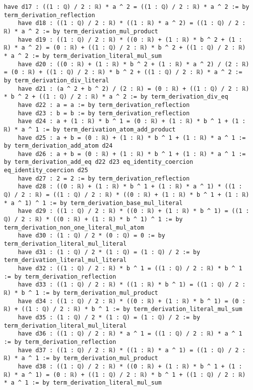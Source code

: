 \documentclass{article}
\begin{document}
\begin{tcolorbox}[colback=white!10, width=\linewidth]
\begin{lstlisting}[language=Lean4]
    have d17 : ((1 : ℚ) / 2 : ℝ) * a ^ 2 = ((1 : ℚ) / 2 : ℝ) * a ^ 2 := by term_derivation_reflection
    have d18 : ((1 : ℚ) / 2 : ℝ) * ((1 : ℝ) * a ^ 2) = ((1 : ℚ) / 2 : ℝ) * a ^ 2 := by term_derivation_mul_product
    have d19 : ((1 : ℚ) / 2 : ℝ) * ((0 : ℝ) + (1 : ℝ) * b ^ 2 + (1 : ℝ) * a ^ 2) = (0 : ℝ) + ((1 : ℚ) / 2 : ℝ) * b ^ 2 + ((1 : ℚ) / 2 : ℝ) * a ^ 2 := by term_derivation_literal_mul_sum
    have d20 : ((0 : ℝ) + (1 : ℝ) * b ^ 2 + (1 : ℝ) * a ^ 2) / (2 : ℝ) = (0 : ℝ) + ((1 : ℚ) / 2 : ℝ) * b ^ 2 + ((1 : ℚ) / 2 : ℝ) * a ^ 2 := by term_derivation_div_literal
    have d21 : (a ^ 2 + b ^ 2) / (2 : ℝ) = (0 : ℝ) + ((1 : ℚ) / 2 : ℝ) * b ^ 2 + ((1 : ℚ) / 2 : ℝ) * a ^ 2 := by term_derivation_div_eq
    have d22 : a = a := by term_derivation_reflection
    have d23 : b = b := by term_derivation_reflection
    have d24 : a + (1 : ℝ) * b ^ 1 = (0 : ℝ) + (1 : ℝ) * b ^ 1 + (1 : ℝ) * a ^ 1 := by term_derivation_atom_add_product
    have d25 : a + b = (0 : ℝ) + (1 : ℝ) * b ^ 1 + (1 : ℝ) * a ^ 1 := by term_derivation_add_atom d24
    have d26 : a + b = (0 : ℝ) + (1 : ℝ) * b ^ 1 + (1 : ℝ) * a ^ 1 := by term_derivation_add_eq d22 d23 eq_identity_coercion eq_identity_coercion d25
    have d27 : 2 = 2 := by term_derivation_reflection
    have d28 : ((0 : ℝ) + (1 : ℝ) * b ^ 1 + (1 : ℝ) * a ^ 1) * ((1 : ℚ) / 2 : ℝ) = ((1 : ℚ) / 2 : ℝ) * ((0 : ℝ) + (1 : ℝ) * b ^ 1 + (1 : ℝ) * a ^ 1) ^ 1 := by term_derivation_base_mul_literal
    have d29 : ((1 : ℚ) / 2 : ℝ) * ((0 : ℝ) + (1 : ℝ) * b ^ 1) = ((1 : ℚ) / 2 : ℝ) * ((0 : ℝ) + (1 : ℝ) * b ^ 1) ^ 1 := by term_derivation_non_one_literal_mul_atom
    have d30 : (1 : ℚ) / 2 * (0 : ℚ) = 0 := by term_derivation_literal_mul_literal
    have d31 : (1 : ℚ) / 2 * (1 : ℚ) = (1 : ℚ) / 2 := by term_derivation_literal_mul_literal
    have d32 : ((1 : ℚ) / 2 : ℝ) * b ^ 1 = ((1 : ℚ) / 2 : ℝ) * b ^ 1 := by term_derivation_reflection
    have d33 : ((1 : ℚ) / 2 : ℝ) * ((1 : ℝ) * b ^ 1) = ((1 : ℚ) / 2 : ℝ) * b ^ 1 := by term_derivation_mul_product
    have d34 : ((1 : ℚ) / 2 : ℝ) * ((0 : ℝ) + (1 : ℝ) * b ^ 1) = (0 : ℝ) + ((1 : ℚ) / 2 : ℝ) * b ^ 1 := by term_derivation_literal_mul_sum
    have d35 : (1 : ℚ) / 2 * (1 : ℚ) = (1 : ℚ) / 2 := by term_derivation_literal_mul_literal
    have d36 : ((1 : ℚ) / 2 : ℝ) * a ^ 1 = ((1 : ℚ) / 2 : ℝ) * a ^ 1 := by term_derivation_reflection
    have d37 : ((1 : ℚ) / 2 : ℝ) * ((1 : ℝ) * a ^ 1) = ((1 : ℚ) / 2 : ℝ) * a ^ 1 := by term_derivation_mul_product
    have d38 : ((1 : ℚ) / 2 : ℝ) * ((0 : ℝ) + (1 : ℝ) * b ^ 1 + (1 : ℝ) * a ^ 1) = (0 : ℝ) + ((1 : ℚ) / 2 : ℝ) * b ^ 1 + ((1 : ℚ) / 2 : ℝ) * a ^ 1 := by term_derivation_literal_mul_sum

\end{lstlisting}
\end{tcolorbox}
\end{document}
